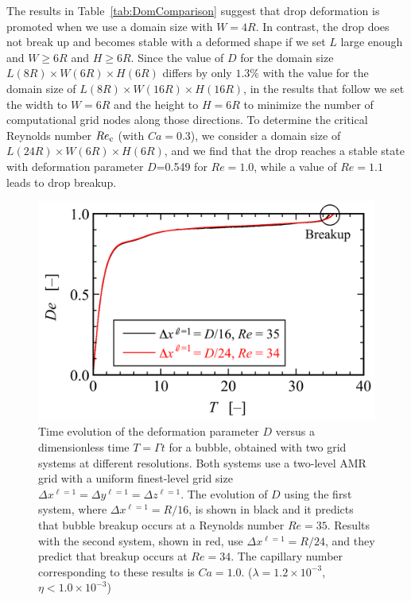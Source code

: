 \documentclass[%
 reprint,
 showkeys,
 amsmath,amssymb,
 aps,
 prfluids,
 onecolumn
]{revtex4-2}
\newcommand{\lwh}[3]{L(#1R)\times W(#2R) \times H(#3R)}
\begin{document}
The results in Table~\ref{tab:DomComparison} suggest that drop deformation is
promoted when we use a domain size with $W=4R$.  In contrast, the drop does not
break up and becomes stable with a deformed shape if we set $L$ large enough
and $W \geq 6R$ and $H \geq 6R$.  Since the value of {\color{red} $D$} for the domain size
$\lwh{8}{6}{6}$ differs by only $1.3\%$ with the value for the domain size of
$\lwh{8}{16}{16}$, in the results that follow we set the width to $W=6R$ and the
height to $H=6R$ to minimize the number of computational grid nodes along those
directions.  To determine the critical Reynolds number $Re_{\rm c}$ (with $Ca=0.3$),
we consider a domain size of $\lwh{24}{6}{6}$, and we find that the drop
reaches a stable state with deformation parameter {\color{red} $D$}=0.549 for $Re=1.0$,
while a value of $Re=1.1$ leads to drop breakup.
% 
\begin{figure}%
  \centering
  \includegraphics[width=\textwidth]{DeEvolution}
  \caption{Time evolution of the deformation parameter {\color{red} $D$} versus 
   a dimensionless
   time $T = \mathit{\Gamma} t$ for a bubble, obtained 
   with two grid systems at different resolutions. Both systems use a 
   two-level AMR grid with a uniform 
   finest-level grid size $\Delta x^{\ell=1} = \Delta y^{\ell=1} = 
   \Delta z ^{\ell=1}$. The evolution of {\color{red} $D$} using the first system, where
   $\Delta x^{\ell=1} = R/16$, is shown in black and it predicts that 
   bubble breakup occurs at a Reynolds number $Re=35$. 
   Results with the second system, shown in red, use $\Delta x^{\ell=1} 
   = R/24$, and they predict that breakup occurs at $Re=34$.  The capillary
   number corresponding to these results is $Ca=1.0$.
   ($\lambda = 1.2 \times 10^{-3}$, $\eta < 1.0 \times 10^{-3}$)}
  \label{fig:DeEvolution}
\end{figure}
%
\end{document}
